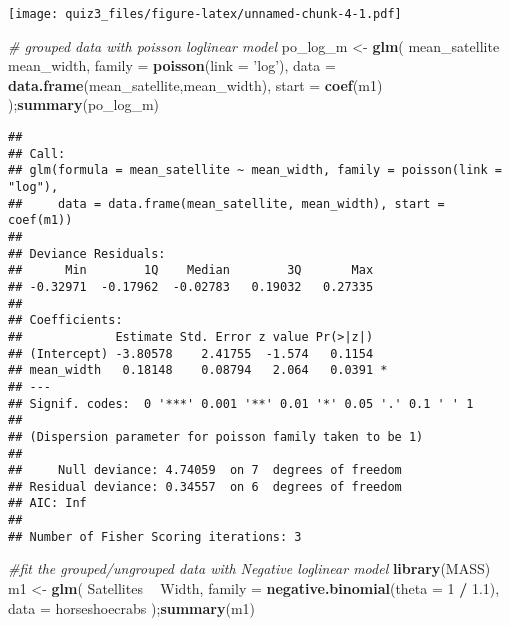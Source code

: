 \documentclass[12pt,hyperref,]{ctexart}
\newenvironment{Shaded}{\begin{snugshade}}{\end{snugshade}}
\newcommand{\CommentTok}[1]{\textcolor[rgb]{0.56,0.35,0.01}{\textit{#1}}}
\newcommand{\DataTypeTok}[1]{\textcolor[rgb]{0.13,0.29,0.53}{#1}}
\newcommand{\DecValTok}[1]{\textcolor[rgb]{0.00,0.00,0.81}{#1}}
\newcommand{\FloatTok}[1]{\textcolor[rgb]{0.00,0.00,0.81}{#1}}
\newcommand{\KeywordTok}[1]{\textcolor[rgb]{0.13,0.29,0.53}{\textbf{#1}}}
\newcommand{\NormalTok}[1]{#1}
\newcommand{\OperatorTok}[1]{\textcolor[rgb]{0.81,0.36,0.00}{\textbf{#1}}}
\newcommand{\StringTok}[1]{\textcolor[rgb]{0.31,0.60,0.02}{#1}}
\begin{document}
\texttt{[image: quiz3\_files/figure-latex/unnamed-chunk-4-1.pdf]}

\begin{Shaded}
\begin{Highlighting}[]
\CommentTok{# grouped data with poisson loglinear model}
\NormalTok{po_log_m <-}\StringTok{ }\KeywordTok{glm}\NormalTok{(}
\NormalTok{  mean_satellite }\OperatorTok{~}\StringTok{ }\NormalTok{mean_width,}
  \DataTypeTok{family =} \KeywordTok{poisson}\NormalTok{(}\DataTypeTok{link =} \StringTok{'log'}\NormalTok{),}
  \DataTypeTok{data =} \KeywordTok{data.frame}\NormalTok{(mean_satellite,mean_width),}
  \DataTypeTok{start =} \KeywordTok{coef}\NormalTok{(m1)}
\NormalTok{);}\KeywordTok{summary}\NormalTok{(po_log_m)}
\end{Highlighting}
\end{Shaded}

\begin{verbatim}
## 
## Call:
## glm(formula = mean_satellite ~ mean_width, family = poisson(link = "log"), 
##     data = data.frame(mean_satellite, mean_width), start = coef(m1))
## 
## Deviance Residuals: 
##      Min        1Q    Median        3Q       Max  
## -0.32971  -0.17962  -0.02783   0.19032   0.27335  
## 
## Coefficients:
##             Estimate Std. Error z value Pr(>|z|)  
## (Intercept) -3.80578    2.41755  -1.574   0.1154  
## mean_width   0.18148    0.08794   2.064   0.0391 *
## ---
## Signif. codes:  0 '***' 0.001 '**' 0.01 '*' 0.05 '.' 0.1 ' ' 1
## 
## (Dispersion parameter for poisson family taken to be 1)
## 
##     Null deviance: 4.74059  on 7  degrees of freedom
## Residual deviance: 0.34557  on 6  degrees of freedom
## AIC: Inf
## 
## Number of Fisher Scoring iterations: 3
\end{verbatim}

\begin{Shaded}
\begin{Highlighting}[]
\CommentTok{#fit the grouped/ungrouped data with Negative loglinear model}
\KeywordTok{library}\NormalTok{(MASS)}
\NormalTok{m1 <-}\StringTok{ }\KeywordTok{glm}\NormalTok{(}
\NormalTok{  Satellites }\OperatorTok{~}\StringTok{ }\NormalTok{Width,}
  \DataTypeTok{family =} \KeywordTok{negative.binomial}\NormalTok{(}\DataTypeTok{theta =} \DecValTok{1} \OperatorTok{/}\StringTok{ }\FloatTok{1.1}\NormalTok{),}
  \DataTypeTok{data =}\NormalTok{ horseshoecrabs}
\NormalTok{);}\KeywordTok{summary}\NormalTok{(m1)}
\end{Highlighting}
\end{Shaded}
\end{document}
